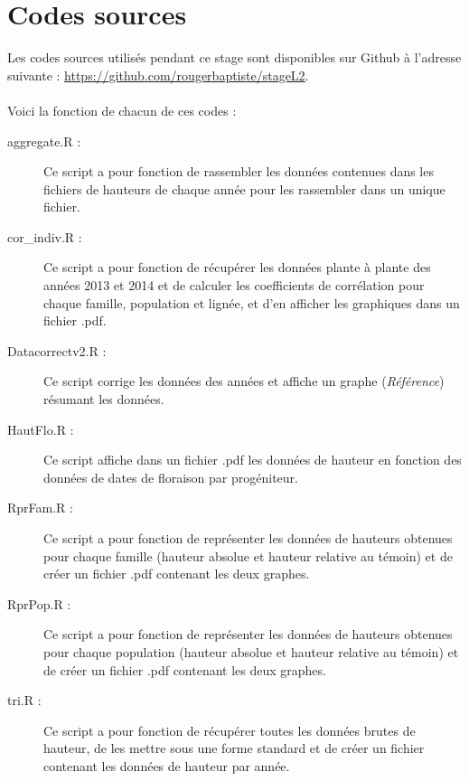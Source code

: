 \documentclass[12pt,a4paper]{article}
\begin{document}
		\section{Codes sources}
		\label{scripts}
		Les codes sources utilisés pendant ce stage sont disponibles sur Github à l'adresse suivante : \url{https://github.com/rougerbaptiste/stageL2}.\\~\\
		Voici la fonction de chacun de ces codes :
		\begin{description}
			\item [aggregate.R :] Ce script a pour fonction de rassembler les données contenues dans les fichiers de hauteurs de chaque année pour les rassembler dans un unique fichier.
			\item [cor\_indiv.R :] Ce script a pour fonction de récupérer les données plante à plante des années 2013 et 2014 et de calculer les coefficients de corrélation pour chaque famille, population et lignée, et d'en afficher les graphiques dans un fichier .pdf.
			\item [Datacorrectv2.R :] Ce script corrige les données des années et affiche un graphe (\textit{Référence}) résumant les données.
			\item [HautFlo.R : ] Ce script affiche dans un fichier .pdf les données de hauteur en fonction des données de dates de floraison par progéniteur.
			\item [RprFam.R :] Ce script a pour fonction de représenter les données de hauteurs obtenues pour chaque famille (hauteur absolue et hauteur relative au témoin) et de créer un fichier .pdf contenant les deux graphes.
			\item [RprPop.R :] Ce script a pour fonction de représenter les données de hauteurs obtenues pour chaque population (hauteur absolue et hauteur relative au témoin) et de créer un fichier .pdf contenant les deux graphes.
			\item [tri.R :] Ce script a pour fonction de récupérer toutes les données brutes de hauteur, de les mettre sous une forme standard et de créer un fichier contenant les données de hauteur par année.
			
		\end{description}
\end{document}
